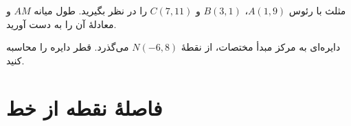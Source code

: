
\vspace{0.6\baselineskip}

\begin{example}
مثلث با رئوس
\(A(1,9)\)، \(B(3,1)\) و \(C(7,11)\)
را در نظر بگیرید. طول میانه \(AM\) و معادلۀ آن
را به دست آورید.
\end{example}


\vspace{0.8\baselineskip}

\begin{example}
دایره‌ای به مرکز مبدأ مختصات، از نقطۀ
\(N(-6,8)\) می‌گذرد. قطر دایره را محاسبه کنید.
\end{example}

\section{فاصلۀ نقطه از خط}



